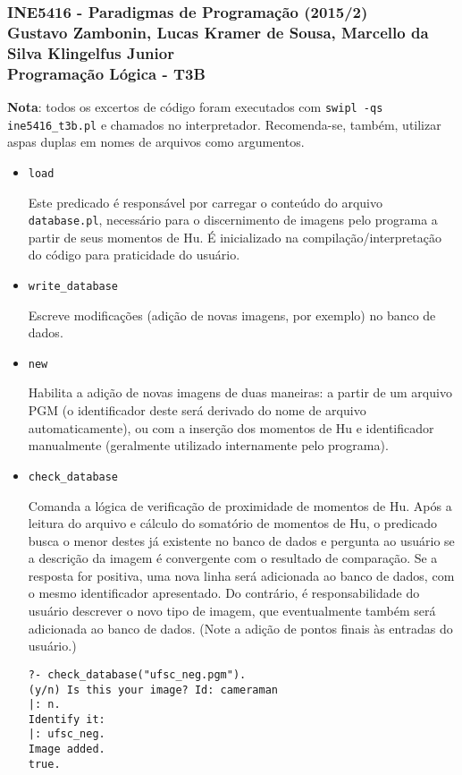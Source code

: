 \documentclass{article}
\begin{document}
\subsubsection*{INE5416 - Paradigmas de Programação (2015/2) \\
    Gustavo Zambonin, Lucas Kramer de Sousa,
    Marcello da Silva Klingelfus Junior \\
    Programação Lógica - T3B
}

\textbf{Nota}: todos os excertos de código foram executados com
\texttt{swipl -qs ine5416\_t3b.pl} e chamados no interpretador. Recomenda-se,
também, utilizar aspas duplas em nomes de arquivos como argumentos.

\begin{itemize}

\item \texttt{load}

Este predicado é responsável por carregar o conteúdo do arquivo
\texttt{database.pl}, necessário para o discernimento de imagens pelo programa
a partir de seus momentos de Hu. É inicializado na compilação/interpretação do
código para praticidade do usuário.

\item \texttt{write\_database}

Escreve modificações (adição de novas imagens, por exemplo) no banco de dados.

\item \texttt{new}

Habilita a adição de novas imagens de duas maneiras: a partir de um arquivo PGM
(o identificador deste será derivado do nome de arquivo automaticamente), ou
com a inserção dos momentos de Hu e identificador manualmente (geralmente
utilizado internamente pelo programa).

\item \texttt{check\_database}

Comanda a lógica de verificação de proximidade de momentos de Hu. Após a leitura
do arquivo e cálculo do somatório de momentos de Hu, o predicado busca o menor
destes já existente no banco de dados e pergunta ao usuário se a descrição da
imagem é convergente com o resultado de comparação. Se a resposta for positiva,
uma nova linha será adicionada ao banco de dados, com o mesmo identificador
apresentado. Do contrário, é responsabilidade do usuário descrever o novo tipo
de imagem, que eventualmente também será adicionada ao banco de dados. (Note a
adição de pontos finais às entradas do usuário.)
\begin{verbatim}
?- check_database("ufsc_neg.pgm").
(y/n) Is this your image? Id: cameraman
|: n.
Identify it:
|: ufsc_neg.
Image added.
true.


\end{verbatim}
\end{itemize}
\end{document}
